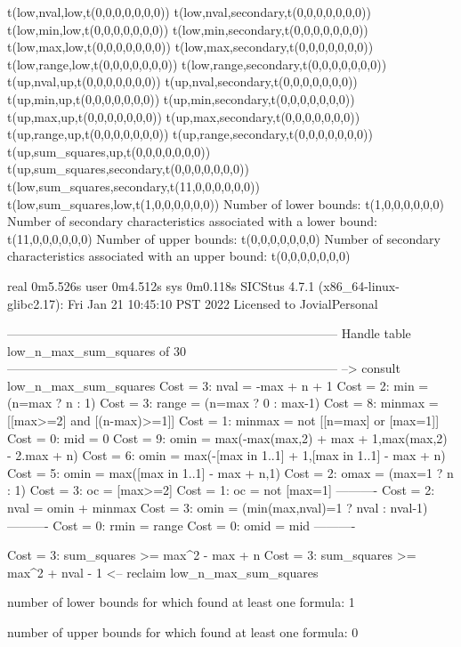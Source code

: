 t(low,nval,low,t(0,0,0,0,0,0,0))
t(low,nval,secondary,t(0,0,0,0,0,0,0))
t(low,min,low,t(0,0,0,0,0,0,0))
t(low,min,secondary,t(0,0,0,0,0,0,0))
t(low,max,low,t(0,0,0,0,0,0,0))
t(low,max,secondary,t(0,0,0,0,0,0,0))
t(low,range,low,t(0,0,0,0,0,0,0))
t(low,range,secondary,t(0,0,0,0,0,0,0))
t(up,nval,up,t(0,0,0,0,0,0,0))
t(up,nval,secondary,t(0,0,0,0,0,0,0))
t(up,min,up,t(0,0,0,0,0,0,0))
t(up,min,secondary,t(0,0,0,0,0,0,0))
t(up,max,up,t(0,0,0,0,0,0,0))
t(up,max,secondary,t(0,0,0,0,0,0,0))
t(up,range,up,t(0,0,0,0,0,0,0))
t(up,range,secondary,t(0,0,0,0,0,0,0))
t(up,sum_squares,up,t(0,0,0,0,0,0,0))
t(up,sum_squares,secondary,t(0,0,0,0,0,0,0))
t(low,sum_squares,secondary,t(11,0,0,0,0,0,0))
t(low,sum_squares,low,t(1,0,0,0,0,0,0))
Number of lower bounds:                                             t(1,0,0,0,0,0,0)
Number of secondary characteristics associated with a lower bound:  t(11,0,0,0,0,0,0)
Number of upper bounds:                                             t(0,0,0,0,0,0,0)
Number of secondary characteristics associated with an upper bound: t(0,0,0,0,0,0,0)

real	0m5.526s
user	0m4.512s
sys	0m0.118s
SICStus 4.7.1 (x86_64-linux-glibc2.17): Fri Jan 21 10:45:10 PST 2022
Licensed to JovialPersonal


--------------------------------------------------------------------------------
Handle table low_n_max_sum_squares of 30
--------------------------------------------------------------------------------
--> consult low_n_max_sum_squares
Cost =  3:  nval   = -max + n + 1
Cost =  2:  min    = (n=max ? n : 1)
Cost =  3:  range  = (n=max ? 0 : max-1)
Cost =  8:  minmax = [[max>=2] and [(n-max)>=1]]
Cost =  1:  minmax = not [[n=max] or [max=1]]
Cost =  0:  mid    = 0
Cost =  9:  omin   = max(-max(max,2) + max + 1,max(max,2) - 2.max + n)
Cost =  6:  omin   = max(-[max in 1..1] + 1,[max in 1..1] - max + n)
Cost =  5:  omin   = max([max in 1..1] - max + n,1)
Cost =  2:  omax   = (max=1 ? n : 1)
Cost =  3:  oc     = [max>=2]
Cost =  1:  oc     = not [max=1]
----------
Cost =  2:  nval   = omin + minmax
Cost =  3:  omin   = (min(max,nval)=1 ? nval : nval-1)
----------
Cost =  0:  rmin   = range
Cost =  0:  omid   = mid
----------

Cost =  3:  sum_squares >= max^2 - max + n
Cost =  3:  sum_squares >= max^2 + nval - 1
<-- reclaim low_n_max_sum_squares

number of lower bounds for which found at least one formula: 1

number of upper bounds for which found at least one formula: 0

